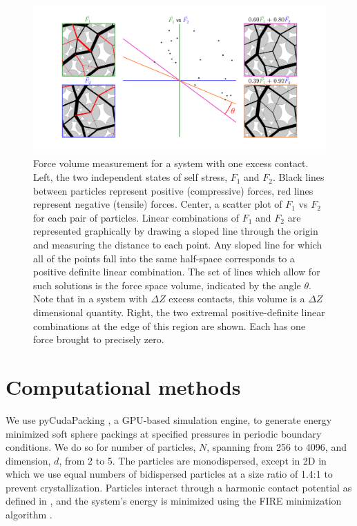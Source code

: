 \begin{figure}[t]
\centering
\includegraphics[width=\textwidth, trim=150 70 150 70, clip]{forceVolumeEntropyPaper/methodIllustration.pdf}
\caption{Force volume measurement for a system with one excess contact. Left, the two independent states of self stress, $F_1$ and $F_2$. Black lines between particles represent positive (compressive) forces, red lines represent negative (tensile) forces. 
Center, a scatter plot of $F_1$ vs $F_2$ for each pair of particles. Linear combinations of $F_1$ and $F_2$ are represented graphically by drawing a sloped line through the origin and measuring the distance to each point.  Any sloped line for which all of the points fall into the same half-space corresponds to a positive definite linear combination. The set of lines which allow for such solutions is the force space volume, indicated by the angle $\theta$. Note that in a system with $\Delta Z$ excess contacts, this volume is a $\Delta Z$ dimensional quantity.
Right, the two extremal positive-definite linear combinations at the edge of this region are shown. Each has one force brought to precisely zero.}
\label{methodIllustrationFigure}
\end{figure}

 \section{Computational methods} We use pyCudaPacking \cite{charbonneau_universal_2012}, a GPU-based simulation engine, to generate energy minimized soft sphere packings at specified pressures in periodic boundary conditions. We do so for number of particles, $N$, spanning from 256 to 4096, and dimension, $d$, from 2 to 5. The particles are monodispersed, except in 2D in which we use equal numbers of bidispersed particles at a size ratio of 1.4:1 to prevent crystallization. Particles interact through a harmonic contact potential as defined in \cite{charbonneau_universal_2012}, and the system's energy is minimized using the FIRE minimization algorithm \cite{bitzek_structural_2006}.
 
